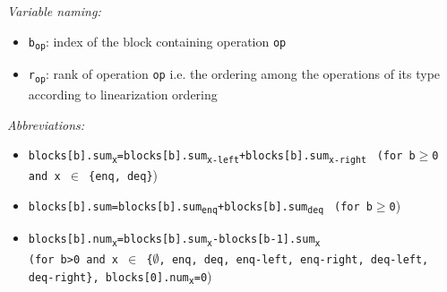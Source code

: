 \documentclass[10pt]{article}
\newcommand{\sub}[1]{\textsubscript{#1}}
\renewcommand{\tt}[1]{\texttt{#1}}
\renewcommand{\it}[1]{\textit{#1}}
\theoremstyle{definition}
\begin{document}
\begin{footnotesize}
  
\it{Variable naming:}
\begin{itemize}
  \item \tt{b\sub{op}}: index of the block containing operation \tt{op}
  \item \tt{r\sub{op}}: rank of operation \tt{op} i.e. the ordering among the operations of its type according to linearization ordering
\end{itemize}

\it{Abbreviations:}
\begin{itemize}
 \item \tt{blocks[b].sum\sub{x}=blocks[b].sum\sub{x-left}+blocks[b].sum\sub{x-right}}  \tt{ (for b$\geq$0 and x $\in$ \{enq, deq\}})
 \item \tt{blocks[b].sum=blocks[b].sum\sub{enq}+blocks[b].sum\sub{deq}}  \tt{ (for b$\geq$0})
  \item \tt{blocks[b].num\sub{x}=blocks[b].sum\sub{x}-blocks[b-1].sum\sub{x}} \\ \tt{(for b>0 and x $\in$ \{$\emptyset$, enq, deq, enq-left, enq-right, deq-left, deq-right\}, blocks[0].num\sub{x}=0})
\end{itemize}
\end{footnotesize}



\end{document}
